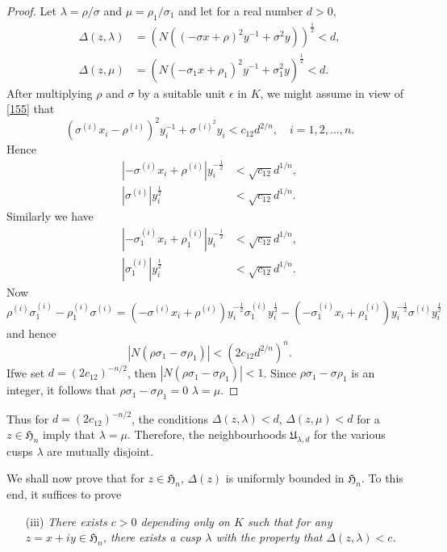 \begin{proof}
Let $\lambda=\rho/\sigma$ and $\mu=\rho_{1}/\sigma_{1}$ and let for a
real number $d>0$,
\begin{align*}
\Delta(z,\lambda) &= (N((-\sigma
x+\rho)^{2}y^{-1}+\sigma^{2}y))^{\frac{1}{2}}<d,\\
\Delta(z,\mu) &=
(N(-\sigma_{1}x+\rho_{1})^{2}y^{-1}+\sigma^{2}_{1}y)^{\frac{1}{2}}<d. 
\end{align*}
After multiplying $\rho$ and $\sigma$ by a suitable unit $\epsilon$ in
$K$, we might assume in view of \eqref{155} that
$$
(\sigma^{(i)}x_{i}-\rho^{(i)})^{2}y^{-1}_{i}+\sigma^{(i)^{2}}y_{i}<c_{12}d^{2/n},\quad
i=1,2,\ldots,n. 
$$
Hence
\begin{align*}
|-\sigma^{(i)}x_{i}+\rho^{(i)}|y^{-\frac{1}{2}}_{i} &<
\sqrt{c_{12}}d^{1/n},\\
|\sigma^{(i)}|y^{\frac{1}{2}}_{i} &< \sqrt{c_{12}}d^{1/n}. 
\end{align*}
Similarly we have
\begin{align*}
|-\sigma^{(i)}_{1}x_{i}+\rho^{(i)}_{1}|y^{-\frac{1}{2}}_{i} &<
\sqrt{c_{12}}d^{1/n},\\
|\sigma^{(i)}_{1}|y^{\frac{1}{2}}_{i} &< \sqrt{c_{12}}d^{1/n}.
\end{align*}
Now
$$
\rho^{(i)}\sigma^{(i)}_{1}-\rho^{(i)}_{1}\sigma^{(i)}=(-\sigma^{(i)}x_{i}+\rho^{(i)})y^{-\frac{1}{2}}_{i}\sigma^{(i)}_{1}y^{\frac{1}{2}}_{i}-(-\sigma^{(i)}_{1}x_{i}+\rho^{(i)}_{1})y^{-\frac{1}{2}}_{i}\sigma^{(i)}y^{\frac{1}{2}}_{i}
$$
and hence
$$
|N(\rho\sigma_{1}-\sigma\rho_{1})|<(2c_{12}d^{2/n})^{n}.
$$
If\pageoriginale we set $d=(2c_{12})^{-n/2}$, then
$|N(\rho\sigma_{1}-\sigma\rho_{1})|<1$. Since
$\rho\sigma_{1}-\sigma\rho_{1}$ is an integer, it follows that
$\rho\sigma_{1}-\sigma\rho_{1}=0$ \ie $\lambda=\mu$.
\end{proof}

Thus for $d=(2c_{12})^{-n/2}$, the conditions $\Delta(z,\lambda)<d$,
$\Delta(z,\mu)<d$ for a $z\in\mathfrak{H}_{n}$ imply that
$\lambda=\mu$. Therefore, the neighbourhoods
$\mathfrak{U}_{\lambda,d}$ for the various cusps $\lambda$ are
mutually disjoint.

We shall now prove that for $z\in\mathfrak{H}_{n}$, $\Delta(z)$ is
uniformly bounded in $\mathfrak{H}_{n}$. To this end, it suffices to
prove

\begin{itemize}
\item[(iii)] {\em There exists $c>0$ depending only on $K$ such that
  for any $z=x+iy\in\mathfrak{H}_{n}$, there exists a cusp $\lambda$
  with the property that $\Delta(z,\lambda)<c$.}
\end{itemize}

